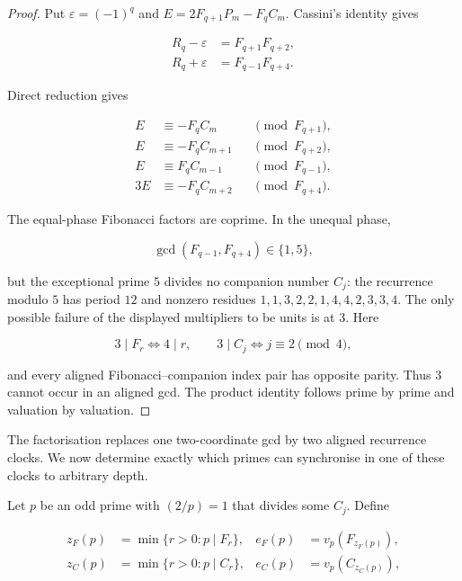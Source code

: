 \begin{proof}
Put $\varepsilon=(-1)^q$ and
$E=2F_{q+1}P_m-F_qC_m$. Cassini's identity gives

\begin{equation}
\begin{aligned}
 R_q-\varepsilon&=F_{q+1}F_{q+2},\\
 R_q+\varepsilon&=F_{q-1}F_{q+4}.
\end{aligned}
\label{eq:local-cassini-factors}
\end{equation}

Direct reduction gives

\begin{equation}
\begin{aligned}
 E&\equiv-F_qC_m&&\pmod {F_{q+1}},\\
 E&\equiv-F_qC_{m+1}&&\pmod {F_{q+2}},\\
 E&\equiv F_qC_{m-1}&&\pmod {F_{q-1}},\\
 3E&\equiv-F_qC_{m+2}&&\pmod {F_{q+4}}.
\end{aligned}
\label{eq:local-companion-reductions}
\end{equation}

The equal-phase Fibonacci factors are coprime. In the unequal phase,

\[
 \gcd(F_{q-1},F_{q+4})\in\{1,5\},
\]

but the exceptional prime $5$ divides no companion number $C_j$: the
recurrence modulo $5$ has period $12$ and nonzero residues
$1,1,3,2,2,1,4,4,2,3,3,4$. The only possible failure of the displayed
multipliers to be units is at $3$. Here

\[
 3\mid F_r\Longleftrightarrow4\mid r,
 \qquad
 3\mid C_j\Longleftrightarrow j\equiv2\pmod4,
\]

and every aligned Fibonacci--companion index pair has opposite parity.
Thus $3$ cannot occur in an aligned gcd. The product identity follows prime
by prime and valuation by valuation.
\end{proof}

The factorisation replaces one two-coordinate gcd by two aligned recurrence
clocks. We now determine exactly which primes can synchronise in one of
these clocks to arbitrary depth.

Let $p$ be an odd prime with $(2/p)=1$ that divides some $C_j$. Define

\begin{equation}
\begin{aligned}
 z_F(p)&=\min\{r>0:p\mid F_r\},
 &e_F(p)&=v_p(F_{z_F(p)}),\\
 z_C(p)&=\min\{r>0:p\mid C_r\},
 &e_C(p)&=v_p(C_{z_C(p)}),
\end{aligned}
\label{eq:local-ranks}
\end{equation}

